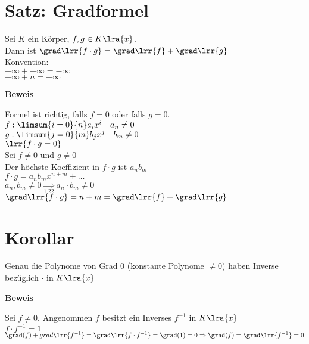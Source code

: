 \section{Satz: Gradformel}
	Sei $K$ ein Körper, $f,g\in K\lra{x}$.\\
	Dann ist $\grad\lrr{f\cdot g}=\grad\lrr{f}+\grad\lrr{g}$\\
	Konvention:\\
	$-\infty+-\infty=-\infty$\\
	$-\infty+n=-\infty$

	\textbf{Beweis}

	Formel ist richtig, falls $f=0$ oder falls $g=0$.\\
	$f:\limsum{i=0}{n}a_ix^i\quad a_n\neq 0$\\
	$g:\limsum{j=0}{m}b_jx^j\quad b_m\neq 0$\\
	$\lrr{f\cdot g = 0}$\\
	Sei $f\neq 0$ und $g\neq 0$\\
	Der höchste Koeffizient in $f\cdot g$ ist $a_nb_m$\\
	$f\cdot g=a_nb_mx^{n+m}+\dots$\\
	$a_n,b_m\neq 0\underset{1.22}{\Rightarrow}a_n\cdot b_m\neq 0$\\
	$\grad\lrr{f\cdot g}=n+m=\grad\lrr{f}+\grad\lrr{g}$
\section{Korollar}
	Genau die Polynome von Grad $0$ (konstante Polynome $\neq 0$) haben Inverse bezüglich $\cdot$ in $K\lra{x}$

	\textbf{Beweis}

	Sei $f\neq 0$. Angenommen $f$ besitzt ein Inverses $f^{-1}$ in $K\lra{x}$\\
	$f\cdot f^{-1} =1$\\
	$\grad(f)+grad\lrr{f^{-1}}=\grad\lrr{f\cdot f^{-1}}=\grad(1)=0\Rightarrow\grad(f)=\grad\lrr{f^{-1}}= 0$

